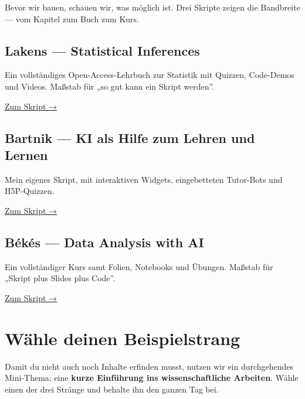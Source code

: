 \documentclass[
  ngerman,
  a4paper,
  DIV=11]{scrreprt}
\begin{document}
Bevor wir bauen, schauen wir, was möglich ist. Drei Skripte zeigen die
Bandbreite --- vom Kapitel zum Buch zum Kurs.

\subsection{Lakens --- Statistical
Inferences}\label{lakens-statistical-inferences}

Ein vollständiges Open-Access-Lehrbuch zur Statistik mit Quizzen,
Code-Demos und Videos. Maßstab für „so gut kann ein Skript werden''.

\href{https://lakens.github.io/statistical_inferences/}{Zum Skript →}

\subsection{Bartnik --- KI als Hilfe zum Lehren und
Lernen}\label{bartnik-ki-als-hilfe-zum-lehren-und-lernen}

Mein eigenes Skript, mit interaktiven Widgets, eingebetteten Tutor-Bots
und H5P-Quizzen.

\href{https://th-koln-bartnik.github.io/genai4teaching/}{Zum Skript →}

\subsection{Békés --- Data Analysis with
AI}\label{buxe9kuxe9s-data-analysis-with-ai}

Ein vollständiger Kurs samt Folien, Notebooks und Übungen. Maßstab für
„Skript plus Slides plus Code''.

\href{https://gabors-data-analysis.com/ai-course/}{Zum Skript →}

\section{Wähle deinen
Beispielstrang}\label{wuxe4hle-deinen-beispielstrang}

Damit du nicht auch noch Inhalte erfinden musst, nutzen wir ein
durchgehendes Mini-Thema: eine \textbf{kurze Einführung ins
wissenschaftliche Arbeiten}. Wähle einen der drei Stränge und behalte
ihn den ganzen Tag bei.
\end{document}
